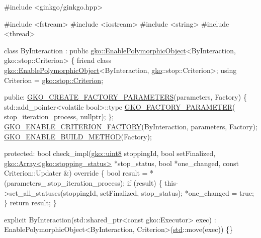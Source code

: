 \begin{DoxyCodeInclude}
\textcolor{preprocessor}{#include <ginkgo/ginkgo.hpp>}


\textcolor{preprocessor}{#include <fstream>}
\textcolor{preprocessor}{#include <iostream>}
\textcolor{preprocessor}{#include <string>}
\textcolor{preprocessor}{#include <thread>}


\textcolor{keyword}{class }ByInteraction
    : \textcolor{keyword}{public} \hyperlink{classgko_1_1EnablePolymorphicObject}{gko::EnablePolymorphicObject}<ByInteraction, gko::stop::Criterion>
       \{
    \textcolor{keyword}{friend} \textcolor{keyword}{class }\hyperlink{classgko_1_1EnablePolymorphicObject}{gko::EnablePolymorphicObject}<ByInteraction,
                                              \hyperlink{namespacegko}{gko}::stop::Criterion>;
    using Criterion = \hyperlink{classgko_1_1stop_1_1Criterion}{gko::stop::Criterion};

\textcolor{keyword}{public}:
    \hyperlink{group__LinOp_ga1fc8e9d8be0c9ad2d72bc1ddfc6d8358}{GKO\_CREATE\_FACTORY\_PARAMETERS}(parameters, Factory)
    \{
        std::add\_pointer<volatile bool>::type \hyperlink{group__LinOp_gaa037309884bbd0562b897cee95dd91c8}{GKO\_FACTORY\_PARAMETER}(
            stop\_iteration\_process, \textcolor{keyword}{nullptr});
    \};
    \hyperlink{group__stop_ga5a998013602bad749e586a5664670cae}{GKO\_ENABLE\_CRITERION\_FACTORY}(ByInteraction, parameters, Factory);
    \hyperlink{group__LinOp_ga521f65604cc4cf427dcb2ecfa49b757c}{GKO\_ENABLE\_BUILD\_METHOD}(Factory);

\textcolor{keyword}{protected}:
    \textcolor{keywordtype}{bool} check\_impl(\hyperlink{namespacegko_a3950fc3732811a8563484e5098c31531}{gko::uint8} stoppingId, \textcolor{keywordtype}{bool} setFinalized,
                    \hyperlink{classgko_1_1Array}{gko::Array<gko::stopping\_status>} *stop\_status,
                    \textcolor{keywordtype}{bool} *one\_changed, \textcolor{keyword}{const} Criterion::Updater &)\textcolor{keyword}{ override}
\textcolor{keyword}{    }\{
        \textcolor{keywordtype}{bool} result = *(parameters\_.stop\_iteration\_process);
        \textcolor{keywordflow}{if} (result) \{
            this->set\_all\_statuses(stoppingId, setFinalized, stop\_status);
            *one\_changed = \textcolor{keyword}{true};
        \}
        \textcolor{keywordflow}{return} result;
    \}

    \textcolor{keyword}{explicit} ByInteraction(std::shared\_ptr<const gko::Executor> exec)
        : EnablePolymorphicObject<ByInteraction, Criterion>(\hyperlink{namespacestd}{std}::move(exec))
    \{\}


\end{DoxyCodeInclude}
